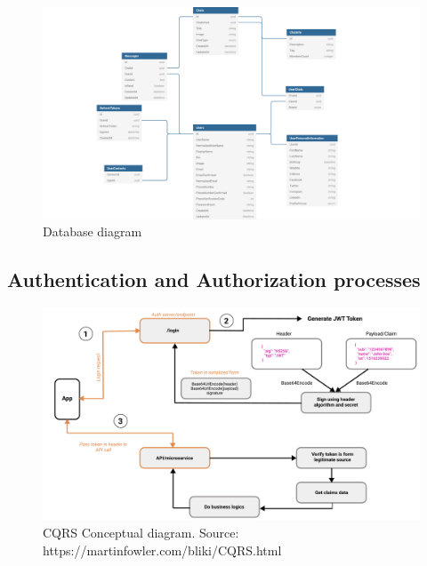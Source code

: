 \begin{figure}[H]
    \centering
    \includegraphics[width=1.2\textwidth]{Pictures/DB_diagram}
    \caption{Database diagram}\label{fig:figure5}
\end{figure}

\subsection{Authentication and Authorization processes}\label{subsec:authentication-and-authorization-processes}
\begin{figure}[H]
    \centering
    \includegraphics[width=1\textwidth]{Pictures/jwt_auth_scheme.pdf}
    \caption{CQRS Conceptual diagram. Source: https://martinfowler.com/bliki/CQRS.html}\label{fig:figure3}
\end{figure}

